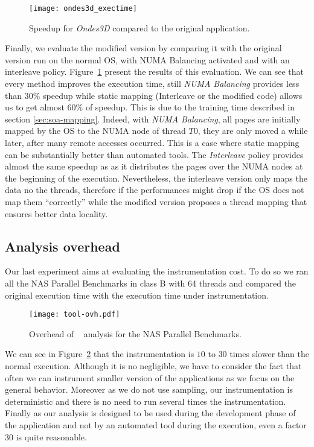 \begin{figure}[htpb]
    \centering
    \texttt{[image: ondes3d\_exectime]}
    \caption{Speedup for \emph{Ondes3D} compared to the original application.}
\label{fig:ondes-res}
\end{figure}

Finally, we evaluate the modified version by comparing it with the original
version run on the normal OS, with NUMA Balancing activated and with an
interleave policy. Figure~\ref{fig:ondes-res} present the results of this
evaluation. We can see that every method improves the execution time, still
\emph{NUMA Balancing} provides less than $30\%$ speedup while static mapping
(Interleave or the modified code) allows us to get almost $60\%$ of speedup. This is
due to the training time described in section \ref{sec:soa-mapping}. Indeed,
with \emph{NUMA Balancing}, all pages are initially mapped by the OS to the NUMA node of thread $T0$, they
are only moved a while later, after many remote accesses occurred. This is a case where static mapping can be substantially better than automated
tools. The \emph{Interleave} policy provides almost the same speedup as
\TABARNAC as it distributes the pages over the NUMA nodes at the beginning of
the execution. Nevertheless, the interleave version only maps the data no the
threads, therefore if the performances might drop if the OS does not map them
``correctly'' while the modified version proposes a thread mapping that ensures better
data locality.

\subsection{Analysis overhead}
\label{sec:expe-overhead}

Our last experiment aims at evaluating the instrumentation cost. To do so we
ran all the NAS Parallel Benchmarks in class B with 64 threads and compared
the original execution time with the execution time under instrumentation.

\begin{figure}[htb]
    \centering
    \texttt{[image: tool-ovh.pdf]}
    \caption{Overhead of \TABARNAC~ analysis for the NAS Parallel Benchmarks.}
    \label{fig:ovh}
\end{figure}


We can see in Figure~\ref{fig:ovh} that
the instrumentation is $10$ to $30$ times slower than the normal execution. Although it is
no negligible, we have to consider the fact that often we can instrument
smaller version of the applications as we focus on the general behavior.
Moreover as we do not use sampling, our instrumentation is deterministic and
there is no need to run several times the instrumentation. Finally as our
analysis is designed to be used during the development phase of the
application and not by an automated tool during the execution, even a factor $30$
is quite reasonable.
